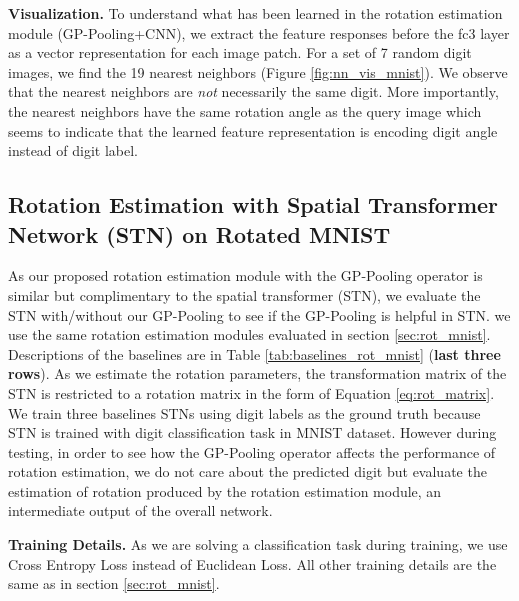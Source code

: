 \documentclass[10pt,twocolumn,letterpaper]{article}
\begin{document}

\vspace{1mm}\noindent\textbf{Visualization.} To understand what has been learned in the rotation estimation module (GP-Pooling+CNN), we extract the feature responses before the fc3 layer as a vector representation for each image patch. For a set of 7 random digit images, we find the 19 nearest neighbors (Figure \ref{fig:nn_vis_mnist}). We observe that the nearest neighbors are \textit{not} necessarily the same digit. More importantly, the nearest neighbors have the same rotation angle as the query image which seems to indicate that the learned feature representation is encoding digit angle instead of digit label.

\subsection{Rotation Estimation with Spatial Transformer Network (STN) on Rotated MNIST} \label{sec:stn_rot_mnist}
As our proposed rotation estimation module with the GP-Pooling operator is similar but complimentary to the spatial transformer (STN), we evaluate the STN with/without our GP-Pooling to see if the GP-Pooling is helpful in STN. we use the same rotation estimation modules evaluated in section \ref{sec:rot_mnist}. Descriptions of the baselines are in Table \ref{tab:baselines_rot_mnist} (\textbf{last three rows}). As we estimate the rotation parameters, the transformation matrix of the STN is restricted to a rotation matrix in the form of Equation \ref{eq:rot_matrix}. We train three baselines STNs using digit labels as the ground truth because STN is trained with digit classification task in MNIST dataset. However during testing, in order to see how the GP-Pooling operator affects the performance of rotation estimation, we do not care about the predicted digit but evaluate the estimation of rotation produced by the rotation estimation module, an intermediate output of the overall network. 

\vspace{1mm}\noindent\textbf{Training Details.} 
As we are solving a classification task during training, we use Cross Entropy Loss instead of Euclidean Loss. All other training details are the same as in section \ref{sec:rot_mnist}. 
 
\end{document}
